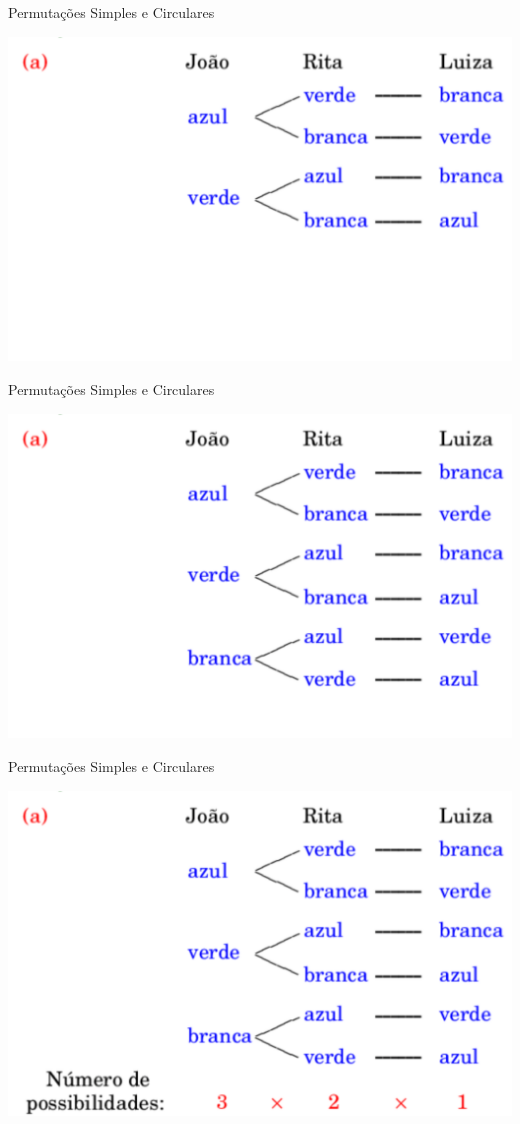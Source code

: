 \documentclass[aspectratio=169]{beamer}
\begin{document}
\begin{frame}{Permutações Simples e Circulares}
    \begin{center}
        \includegraphics[width=0.73\linewidth]{figs/Exemplo1_3.png}
    \end{center}
\end{frame}

\begin{frame}{Permutações Simples e Circulares}
    \begin{center}
        \includegraphics[width=0.73\linewidth]{figs/Exemplo1_4.png}
    \end{center}
\end{frame}

\begin{frame}{Permutações Simples e Circulares}
    \begin{center}
        \includegraphics[width=0.73\linewidth]{figs/Exemplo1_5.png}
    \end{center}
\end{frame}
\end{document}
